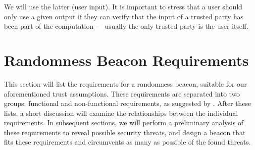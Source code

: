 We will use the latter (user input).
It is important to stress that a user should only use a given output if they can verify that the input of a trusted party has been part of the computation --- usually the only trusted party is the user itself.

\section{Randomness Beacon Requirements}
\label{sec:beacon_requirements}

This section will list the requirements for a randomness beacon, suitable for our aforementioned trust assumptions.
These requirements are separated into two groups: functional and non-functional requirements, as suggested by \citet[sec.\ 1.4.1]{swebok}.
After these lists, a short discussion will examine the relationships between the individual requirements.
In subsequent sections, we will perform a preliminary analysis of these requirements to reveal possible security threats, and design a beacon that fits these requirements and circumvents as many as possible of the found threats.


